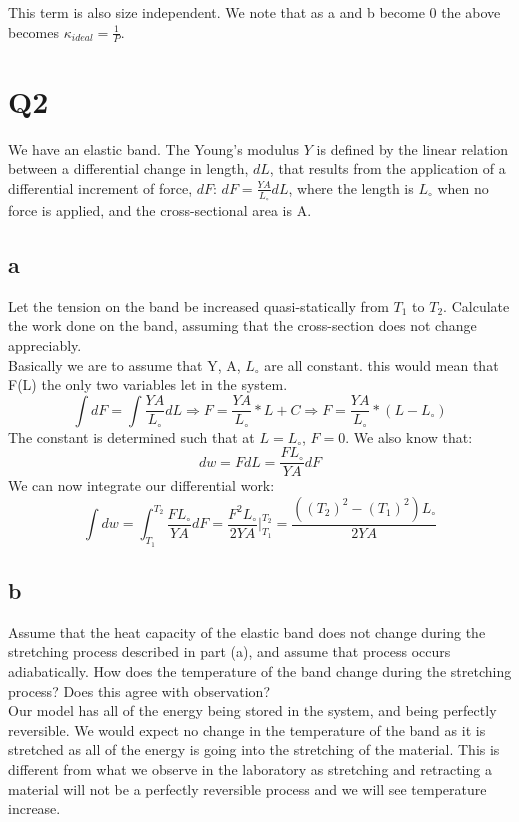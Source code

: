 \documentclass[10pt,a4paper]{article}
\begin{document}
This term is also size independent.  We note that as a and b become 0 the above becomes $\kappa_{ideal} =\frac{1}{P}$.
\section{Q2}
We have an elastic band. The Young’s modulus $Y$ is defined by the linear relation
between a differential change in length, $dL$, that results from the application of a
differential increment of force, $dF$: $dF =\frac{YA}{L_\circ}dL$, where the length is $L_\circ$ when no
force is applied, and the cross-sectional area is A.
\subsection{a}
Let the tension on the band be increased quasi-statically from $T_1$ to $T_2$. Calculate
the work done on the band, assuming that the cross-section does not change
appreciably.\\

Basically we are to assume that Y, A, $L_\circ$ are all constant.  this would mean that F(L) the only two variables let in the system.
\[\int dF =\int \frac{YA}{L_\circ}dL \Longrightarrow F=\frac{YA}{L_\circ}*L+C \Longrightarrow F=\frac{YA}{L_\circ}*(L-L_\circ)\]
The constant is determined such that at $L=L_\circ$, $F=0$.  We also know that: 
\[dw=FdL=\frac{FL_\circ}{YA}dF\]
We can now integrate our differential work:
\[\int dw=\int_{T_1}^{T_2}\frac{FL_\circ}{YA}dF=\frac{F^2L_\circ}{2YA} \biggr|_{T_1}^{T_2}= \frac{((T_2)^2-(T_1)^2)L_\circ}{2YA}\]
\subsection{b}
Assume that the heat capacity of the elastic band does not change during the stretching process described in part (a), and assume that process occurs adiabatically. How does the temperature of the band change during the stretching process? Does this agree with observation?\\

Our model has all of the energy being stored in the system, and being perfectly reversible.  We would expect no change in the temperature of the band as it is stretched as all of the energy is going into the stretching of the material.  This is different from what we observe in the laboratory as stretching and retracting a material will not be a perfectly reversible process and we will see temperature increase.
\end{document}

